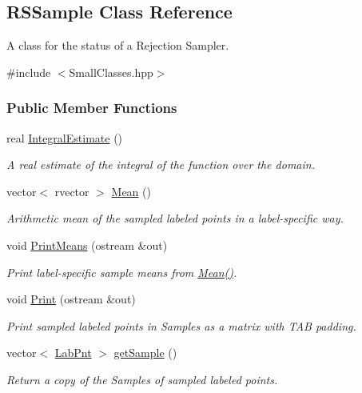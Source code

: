 \hypertarget{classRSSample}{\subsection{\-R\-S\-Sample \-Class \-Reference}
\label{classRSSample}
}


\-A class for the status of a \-Rejection \-Sampler.  




{\ttfamily \#include $<$\-Small\-Classes.\-hpp$>$}

\subsubsection*{\-Public \-Member \-Functions}
\begin{DoxyCompactItemize}
\item 
real \hyperlink{classRSSample_a9537562ed9b4bc945e4c92b2237732a8}{\-Integral\-Estimate} ()
\begin{DoxyCompactList}\small\item\em \-A real estimate of the integral of the function over the domain. \end{DoxyCompactList}\item 
vector$<$ rvector $>$ \hyperlink{classRSSample_a6e553a95e36dbecd6f0491bf71c6a761}{\-Mean} ()
\begin{DoxyCompactList}\small\item\em \-Arithmetic mean of the sampled labeled points in a label-\/specific way. \end{DoxyCompactList}\item 
void \hyperlink{classRSSample_a9a5acffe7b2445f5cf588b0f34256993}{\-Print\-Means} (ostream \&out)
\begin{DoxyCompactList}\small\item\em \-Print label-\/specific sample means from \hyperlink{classRSSample_a6e553a95e36dbecd6f0491bf71c6a761}{\-Mean()}. \end{DoxyCompactList}\item 
void \hyperlink{classRSSample_ae38d39be1ed34d9a06df7f3d76ab2962}{\-Print} (ostream \&out)
\begin{DoxyCompactList}\small\item\em \-Print sampled labeled points in \-Samples as a matrix with \-T\-A\-B padding. \end{DoxyCompactList}\item 
vector$<$ \hyperlink{classLabPnt}{\-Lab\-Pnt} $>$ \hyperlink{classRSSample_a3966506ff75f99c21ffef23f6ca490f4}{get\-Sample} ()
\begin{DoxyCompactList}\small\item\em \-Return a copy of the \-Samples of sampled labeled points. \end{DoxyCompactList}\end{DoxyCompactItemize}
